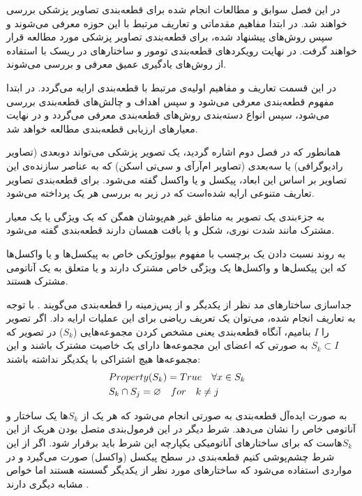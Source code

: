 

در این فصل سوابق و مطالعات انجام شده برای قطعه‌بندی تصاویر پزشکی بررسی خواهند شد. در ابتدا مفاهیم مقدماتی و تعاریف مرتبط با این حوزه معرفی می‌شوند و سپس روش‌های پیشنهاد شده، برای قطعه‌بندی تصاویر پزشکی مورد مطالعه قرار خواهند گرفت. در نهایت رویکردهای قطعه‌بندی تومور و ساختارهای در ریسک با استفاده از روش‌‌های یادگیری عمیق معرفی و بررسی می‌شوند.

در این قسمت تعاریف و مفاهیم اولیه‌ی مرتبط با قطعه‌بندی ارایه می‌گردد. در ابتدا مفهوم قطعه‌بندی معرفی می‌شود و سپس اهداف و چالش‌های قطعه‌بندی بررسی می‌شود، سپس انواع دسته‌بندی روش‌های قطعه‌بندی معرفی می‌گردد و در نهایت معیارهای ارزیابی قطعه‌بندی مطالعه خواهد شد.

همانطور که در فصل دوم اشاره گردید، یک تصویر پزشکی می‌تواند دوبعدی (تصاویر رادیوگرافی) یا سه‌بعدی (تصاویر ام‌آرآی و سی‌تی اسکن) که به عناصر سازنده‌ی این تصاویر بر اساس این ابعاد، پیکسل و یا واکسل گفته می‌شود. برای قطعه‌بندی تصاویر تعاریف متنوعی ارایه شده‌است که در زیر به بررسی هر یک پرداخته می‌شود.

 به جزء‌بندی یک تصویر به مناطق غیر هم‌پوشان همگن که یک ویژگی یا یک معیار مشترک مانند شدت نوری، شکل و یا بافت همسان دارند قطعه‌بندی گفته می‌شود.

 به روند نسبت دادن یک برچسب با مفهوم بیولوژیکی خاص به پیکسل‌ها و یا واکسل‌ها که این پیکسل‌ها و واکسل‌ها یک ویژگی خاص مشترک دارند و یا متعلق به یک آناتومی مشترک هستند. 

 جداسازی ساختارهای مد نظر از یکدیگر و از پس‌زمینه را قطعه‌بندی می‌گویند .
با توجه به تعاریف انجام شده، می‌توان یک تعریف ریاضی برای این عملیات ارایه داد. اگر تصویر را $I$ بنامیم، آنگاه قطعه‌بندی یعنی مشخص کردن مجموعه‌هایی ($S_{k}$) در تصویر که $S_{k} \subset I$ به صورتی که اعضای این مجموعه‌ها دارای یک خاصیت مشترک باشند و این مجموعه‌ها هیچ اشتراکی با یکدیگر نداشته باشند:
\begin{alignat}{5}
	 &Property(S_{k})  = True \quad \forall x  \in  S_{k}     \label{seg_def} && \\
	 &S_{k} \cap S_{j} = \varnothing \quad for \quad k \neq j && \notag
\end{alignat}

به صورت ایده‌آل قطعه‌بندی به صورتی انجام می‌شود که هر یک از $S_{k}$ها یک ساختار و آناتومی خاص را نشان می‌دهد. شرط دیگر در این فرمول‌بندی متصل بودن هریک از این $S_{k}$هاست که برای ساختارهای آناتومیکی یکپارچه این شرط باید برقرار شود. اگر از این شرط چشم‌پوشی کنیم قطعه‌بندی در سطح پیکسل (واکسل) صورت می‌گیرد و در مواردی استفاده می‌شود که ساختارهای مورد نظر از یکدیگر گسسته هستند اما خواص مشابه دیگری دارند . 

